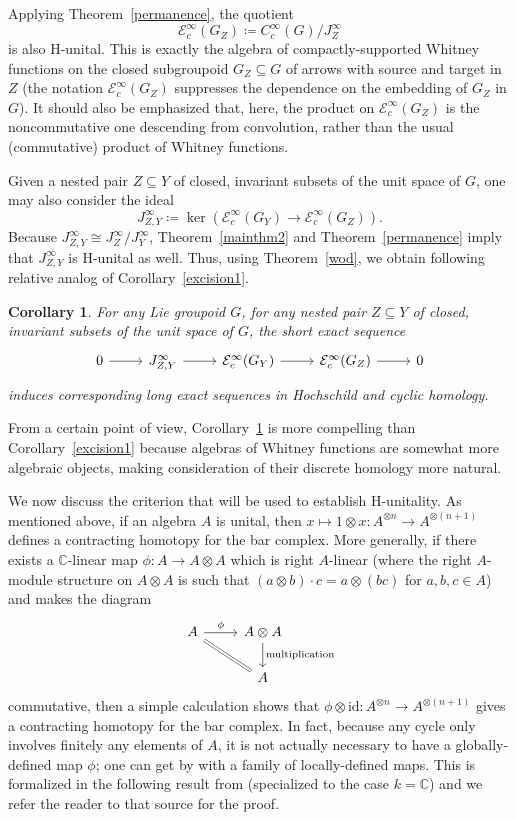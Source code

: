 \documentclass[12pt]{article}
\theoremstyle{plain}
\newtheorem{cor}[thm]{Corollary}
\theoremstyle{definition}
\newcommand{\C}{\mathbb{C}}
\newcommand{\id}{\mathrm{id}}
\numberwithin{equation}{section}
\begin{document}
Applying Theorem~\ref{permanence},  the quotient
\[ \mathcal{E}_c^\infty(G_Z) \coloneqq C_c^\infty(G)/J_Z^\infty \]
is also H-unital. This  is exactly  the algebra of compactly-supported Whitney functions on the closed subgroupoid $G_Z \subseteq G$ of arrows with source and target in $Z$ (the notation $ \mathcal{E}_c^\infty(G_Z)$ suppresses the dependence on the embedding of $G_Z$ in $G$).  It should also be emphasized that, here, the product on $\mathcal{E}_c^\infty(G_Z)$ is the noncommutative one descending from convolution, rather than the usual (commutative)  product of Whitney functions. 

Given a nested pair $Z \subseteq Y$   of closed, invariant subsets of the unit space of $G$, one may also consider the ideal
\[ J_{Z,Y}^\infty \coloneqq \ker(\mathcal{E}_c^\infty(G_Y) \to \mathcal{E}_c^\infty(G_Z)). \] 
Because $J_{Z,Y}^\infty \cong J_Z^\infty/J_Y^\infty$, Theorem~\ref{mainthm2}  and Theorem~\ref{permanence} imply that  $J_{Z,Y}^\infty$ is H-unital as well. Thus, using Theorem~\ref{wod}, we obtain following relative analog of Corollary~\ref{excision1}.
\begin{cor}\label{excisionrel}
For any Lie groupoid $G$, for any nested pair $Z\subseteq Y$ of closed, invariant subsets  of the unit space of $G$,  the short exact sequence
\[ \begin{tikzcd}
0 \ar[r] & J_{Z,Y}^\infty \ar[r] & \mathcal{E}_c^\infty(G_Y) \ar[r] & \mathcal{E}_c^\infty(G_Z) \ar[r] & 0
\end{tikzcd} \]
induces corresponding long exact sequences in Hochschild and cyclic homology.
\end{cor}

From a certain point of view, Corollary~\ref{excisionrel} is more compelling than  Corollary~\ref{excision1} because algebras of Whitney functions are  somewhat more algebraic objects, making consideration of their discrete homology more natural.


We now discuss the criterion that will be used to establish H-unitality. As mentioned above, if an algebra $A$ is unital, then $x \mapsto 1 \otimes x : A^{\otimes n}\to A^{\otimes (n+1)}$ defines a contracting homotopy for the bar complex. More generally, if there exists a $\C$-linear map $\phi : A \to A \otimes A$ which is right $A$-linear (where the  right $A$-module structure on $A\otimes A$ is such that  $(a \otimes b)\cdot c = a\otimes(bc)$ for  $a,b,c \in A$) and makes the diagram
\[ \begin{tikzcd}
A \ar[rd,equals] \ar[r,"{\phi}"] & A \otimes A \ar[d,"\text{multiplication}"] \\
 & A
\end{tikzcd} \]
commutative, then a simple calculation shows that $\phi \otimes \id  : A^{\otimes n}\to A^{\otimes (n+1)}$ gives a contracting homotopy for the bar complex. In fact, because any cycle only involves finitely any elements of $A$, it is not actually necessary to have a globally-defined map $\phi$; one can get by with a family of locally-defined maps. This is formalized in the  following result 
from  \cite{Wodzicki} (specialized to the case $k=\C$) and we refer the reader to that source for the proof. 
\end{document}
